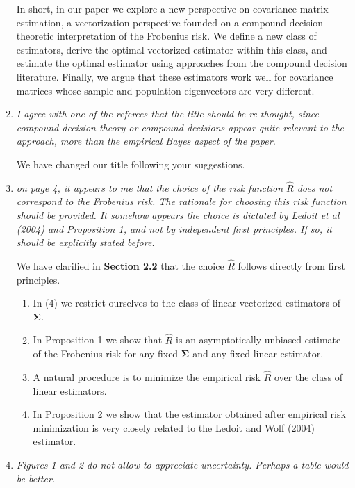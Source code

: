 \documentclass[12pt]{article}
\def\bs{\boldsymbol}
\begin{document}
\begin{enumerate}
  In short, in our paper we explore a new perspective on covariance matrix estimation, a vectorization perspective founded on a compound decision theoretic interpretation of the Frobenius risk. We define a new class of estimators, derive the optimal vectorized estimator within this class, and estimate the optimal estimator using approaches from the compound decision literature. Finally, we argue that these estimators work well for covariance matrices whose sample and population eigenvectors are very different.
  
\item \emph{I agree with one of the referees that the title should be re-thought, since compound decision theory or compound decisions appear quite relevant to the approach, more than the empirical Bayes aspect of the paper.}

  We have changed our title following your suggestions.

\item \emph{on page 4, it appears to me that the choice of the risk function $\hat{R}$ does not correspond to the Frobenius risk. The rationale for choosing this risk function should be provided. It somehow appears the choice is dictated by Ledoit et al (2004) and Proposition 1, and not by independent first principles. If so, it should be explicitly stated before.}

  We have clarified in \textbf{Section 2.2} that the choice $\hat{R}$ follows directly from first principles.
  \begin{enumerate}
  \item In (4) we restrict ourselves to the class of linear vectorized estimators of $\bs{\Sigma}$.
    
  \item In Proposition 1 we show that $\hat{R}$ is an asymptotically unbiased estimate of the Frobenius risk for any fixed $\bs{\Sigma}$ and any fixed linear estimator.

  \item A natural procedure is to minimize the empirical risk $\hat{R}$ over the class of linear estimators.
    
  \item In Proposition 2 we show that the estimator obtained after empirical risk minimization is very closely related to the Ledoit and Wolf (2004) estimator.
  \end{enumerate}

\item \emph{Figures 1 and 2 do not allow to appreciate uncertainty. Perhaps a table would be better.}


\end{enumerate}
\end{document}
